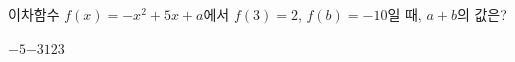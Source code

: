 이차함수 $f(x)=-x^2+5x+a$에서 $f(3)=2$, $f(b)=-10$일 때, $a+b$의 값은? 
\begin{choices32}{$-5$}{$-3$}{$1$}{$2$}{$3$}\end{choices32}
